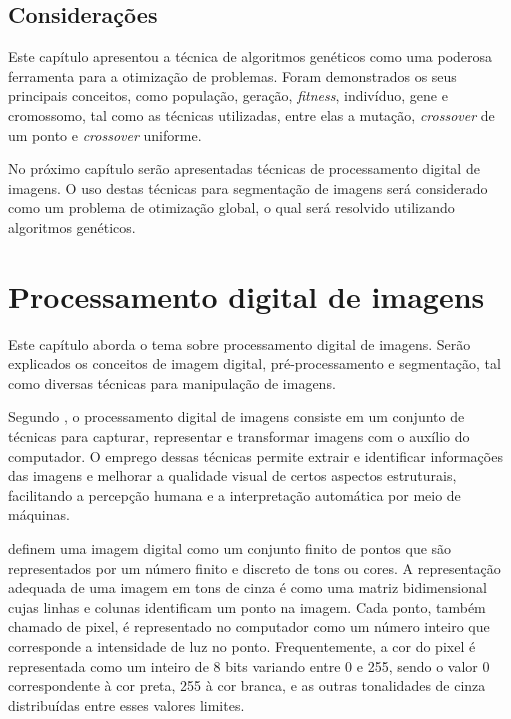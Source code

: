 \documentclass[12pt,oneside,a4paper,english,french,spanish,brazil,]{abntex2}
\begin{document}
\section{Considerações}

Este capítulo apresentou a técnica de algoritmos genéticos como uma poderosa ferramenta para a otimização de problemas. Foram demonstrados os seus principais conceitos, como população, geração, \textit{fitness}, indivíduo, gene e cromossomo, tal como as técnicas utilizadas, entre elas a mutação, \textit{crossover} de um ponto e \textit{crossover} uniforme.

No próximo capítulo serão apresentadas técnicas de processamento digital de imagens. O uso destas técnicas para segmentação de imagens será considerado como um problema de otimização global, o qual será resolvido utilizando algoritmos genéticos.


\chapter{Processamento digital de imagens}
\label{chap:PDI}

Este capítulo aborda o tema sobre processamento digital de imagens. Serão explicados os conceitos de imagem digital, pré-processamento e segmentação, tal como diversas técnicas para manipulação de imagens.

Segundo \citet{pedrini:2008}, o processamento digital de imagens consiste em um conjunto de técnicas para capturar, representar e transformar imagens com o auxílio do computador. O emprego dessas técnicas permite extrair e identificar informações das imagens e melhorar a qualidade visual de certos aspectos estruturais, facilitando a percepção humana e a interpretação automática por meio de máquinas. 

\citet{conci:2003} definem uma imagem digital como um conjunto finito de pontos que são representados por um número finito e discreto de tons ou cores. A representação adequada de uma imagem em tons de cinza é como uma matriz bidimensional cujas linhas e colunas identificam um ponto na imagem. Cada ponto, também chamado de pixel, é representado no computador como um número inteiro que corresponde a intensidade de luz no ponto. Frequentemente, a cor do pixel é representada como um inteiro de 8 bits variando entre 0 e 255, sendo o valor 0 correspondente à cor preta, 255 à cor branca, e as outras tonalidades de cinza distribuídas entre esses valores limites.
\end{document}
